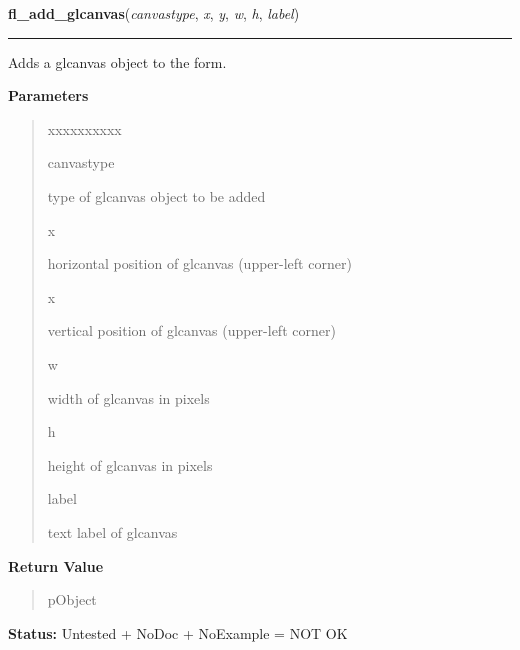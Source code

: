     \label{xformslib:library:fl_add_glcanvas}

    \vspace{0.5ex}

\hspace{.8\funcindent}\begin{boxedminipage}{\funcwidth}

    \raggedright \textbf{fl\_add\_glcanvas}(\textit{canvastype}, \textit{x}, \textit{y}, \textit{w}, \textit{h}, \textit{label})

    \vspace{-1.5ex}

    \rule{\textwidth}{0.5\fboxrule}
\setlength{\parskip}{2ex}
    Adds a glcanvas object to the form.

\setlength{\parskip}{1ex}
      \textbf{Parameters}
      \vspace{-1ex}

      \begin{quote}
        \begin{Ventry}{xxxxxxxxxx}

          \item[canvastype]

          type of glcanvas object to be added

          \item[x]

          horizontal position of glcanvas (upper-left corner)

          \item[x]

          vertical position of glcanvas (upper-left corner)

          \item[w]

          width of glcanvas in pixels

          \item[h]

          height of glcanvas in pixels

          \item[label]

          text label of glcanvas

        \end{Ventry}

      \end{quote}

      \textbf{Return Value}
    \vspace{-1ex}

      \begin{quote}
      pObject

      \end{quote}

\textbf{Status:} Untested + NoDoc + NoExample = NOT OK



    \end{boxedminipage}

